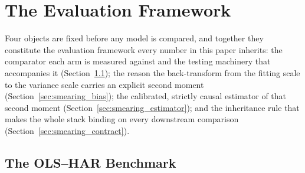 \section{The Evaluation Framework}
\label{sec:evaluation}


Four objects are fixed before any model is compared, and together they
constitute the evaluation framework every number in this paper inherits:
the comparator each arm is measured against and the testing machinery
that accompanies it (Section~\ref{sec:dp_benchmark}); the reason the
back-transform from the fitting scale to the variance scale carries an
explicit second moment (Section~\ref{sec:smearing_bias}); the calibrated,
strictly causal estimator of that second moment
(Section~\ref{sec:smearing_estimator}); and the inheritance rule that
makes the whole stack binding on every downstream comparison
(Section~\ref{sec:smearing_contract}).

\subsection{The OLS--HAR Benchmark}
\label{sec:dp_benchmark}

